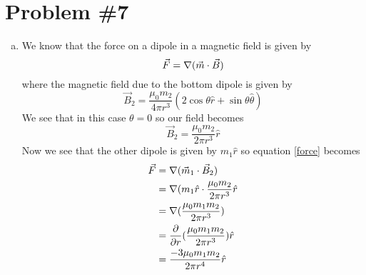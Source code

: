 \documentclass[11pt]{article}
\numberwithin{equation}{section}
\newcommand{\grad}{\bold\nabla}
\begin{document}
\section{Problem \#7}
\begin{enumerate}[(a)]
\item
We know that the force on a dipole in a magnetic field is given by
\begin{equation}
\vec{F} = \grad(\vec{m}\cdot\vec{B})
\label{force}
\end{equation}
where the magnetic field due to the bottom dipole is given by
$$\vec{B}_2 = \frac{\mu_0 m_2}{4\pi r^3}(2\cos\theta\hat{r}+\sin\theta\hat{\theta})$$
We see that in this case $\theta = 0$ so our field becomes
$$\vec{B}_2 = \frac{\mu_0 m_2}{2\pi r^3}\hat{r}$$
Now we see that the other dipole is given by $m_1\hat{r}$ so equation \ref{force} becomes
\begin{align*}
\vec{F} &= \grad(\vec{m}_1\cdot\vec{B}_2)\\
&= \grad(m_1\hat{r}\cdot\frac{\mu_0 m_2}{2\pi r^3}\hat{r}\\
&= \grad(\frac{\mu_0 m_1m_2}{2\pi r^3})\\
&= \frac{\partial}{\partial r}(\frac{\mu_0 m_1m_2}{2\pi r^3})\hat{r}\\
&= \frac{-3\mu_0 m_1m_2}{2\pi r^4}\hat{r}
\end{align*}


\end{enumerate}
\end{document}
